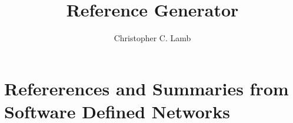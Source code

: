 \documentclass[10pt,letterpaper]{article}
\author{Christopher C. Lamb}
\title{Reference Generator}
\begin{document}
\section{Refererences and Summaries from Software Defined Networks}





\end{document}
